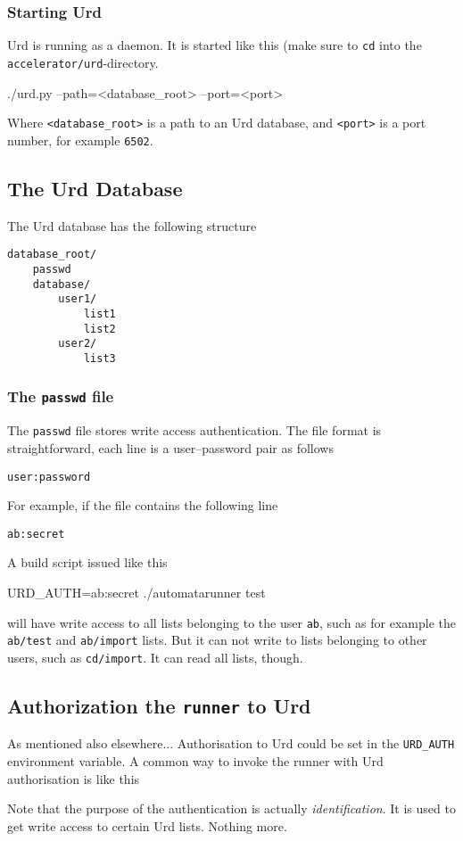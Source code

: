 \subsubsection{Starting Urd}
Urd is running as a daemon.  It is started like this (make sure
to \texttt{cd} into the \texttt{accelerator/urd}-directory.
\begin{shell}
./urd.py --path=<database_root> --port=<port>
\end{shell}
Where \texttt{<database\_root>} is a path to an Urd database,
and \texttt{<port>} is a port number, for example \texttt{6502}.

\subsection{The Urd Database}
The Urd database has the following structure
\begin{verbatim}
database_root/
    passwd
    database/
        user1/
            list1
            list2
        user2/
            list3
\end{verbatim}

\subsubsection{The \texttt{passwd} file}
The \texttt{passwd} file stores write access authentication.  The file
format is straightforward, each line is a user--password pair as follows
\begin{verbatim}
user:password
\end{verbatim}
For example, if the file contains the following line
\begin{verbatim}
ab:secret
\end{verbatim}
A build script issued like this
\begin{shell}
URD_AUTH=ab:secret ./automatarunner test
\end{shell}
will have write access to all lists belonging to the user \texttt{ab},
such as for example the \texttt{ab/test} and \texttt{ab/import} lists.
But it can not write to lists belonging to other users, such
as \texttt{cd/import}.  It can read all lists, though.


\subsection{Authorization the \texttt{runner} to Urd}
As mentioned also elsewhere...
Authorisation to Urd could be set in the \texttt{URD\_AUTH}
environment variable.  A common way to invoke the runner with Urd
authorisation is like this
\begin{shell}
\end{shell}
Note that the purpose of the authentication is
actually \textsl{identification}.  It is used to get write access to
certain Urd lists.  Nothing more.



